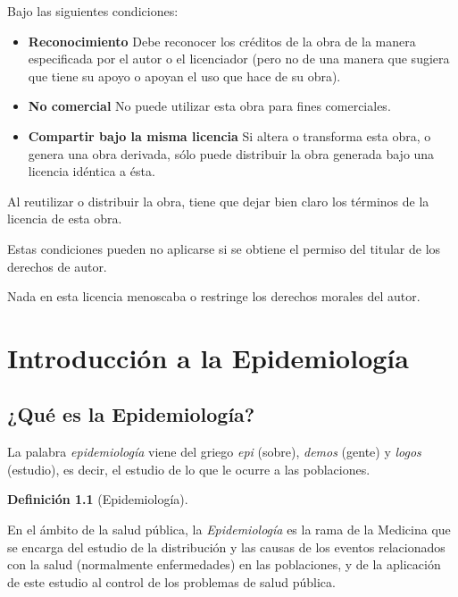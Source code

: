 \documentclass[
  spanish,
  a4paper,
]{scrreport}
\theoremstyle{definition}
\newtheorem{definition}{Definición}[chapter]
\theoremstyle{definition}
\theoremstyle{remark}
\begin{document}
Bajo las siguientes condiciones:

\begin{itemize}
\item
  \textbf{Reconocimiento} Debe reconocer los créditos de la obra de la
  manera especificada por el autor o el licenciador (pero no de una
  manera que sugiera que tiene su apoyo o apoyan el uso que hace de su
  obra).
\item
  \textbf{No comercial} No puede utilizar esta obra para fines
  comerciales.
\item
  \textbf{Compartir bajo la misma licencia} Si altera o transforma esta
  obra, o genera una obra derivada, sólo puede distribuir la obra
  generada bajo una licencia idéntica a ésta.
\end{itemize}

Al reutilizar o distribuir la obra, tiene que dejar bien claro los
términos de la licencia de esta obra.

Estas condiciones pueden no aplicarse si se obtiene el permiso del
titular de los derechos de autor.

Nada en esta licencia menoscaba o restringe los derechos morales del
autor.


\chapter{Introducción a la Epidemiología}\label{sec-introduccion}

\section{¿Qué es la Epidemiología?}\label{quuxe9-es-la-epidemiologuxeda}

La palabra \emph{epidemiología} viene del griego \emph{epi} (sobre),
\emph{demos} (gente) y \emph{logos} (estudio), es decir, el estudio de
lo que le ocurre a las poblaciones.

\begin{definition}[Epidemiología]\protect\hypertarget{def-epidemiologia}{}\label{def-epidemiologia}

En el ámbito de la salud pública, la \emph{Epidemiología} es la rama de
la Medicina que se encarga del estudio de la distribución y las causas
de los eventos relacionados con la salud (normalmente enfermedades) en
las poblaciones, y de la aplicación de este estudio al control de los
problemas de salud pública.

\end{definition}
\end{document}
